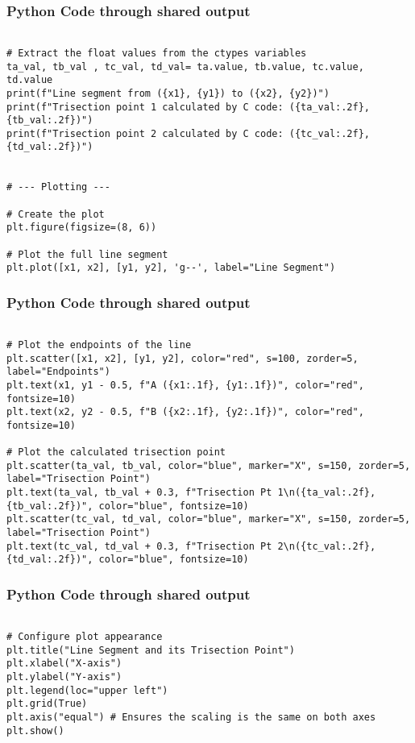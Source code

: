 \documentclass{beamer}
\begin{document}
\begin{frame}[fragile]
\frametitle{Python Code through shared output}
\begin{lstlisting}

# Extract the float values from the ctypes variables
ta_val, tb_val , tc_val, td_val= ta.value, tb.value, tc.value, td.value
print(f"Line segment from ({x1}, {y1}) to ({x2}, {y2})")
print(f"Trisection point 1 calculated by C code: ({ta_val:.2f}, {tb_val:.2f})")
print(f"Trisection point 2 calculated by C code: ({tc_val:.2f}, {td_val:.2f})")


# --- Plotting ---

# Create the plot
plt.figure(figsize=(8, 6))

# Plot the full line segment
plt.plot([x1, x2], [y1, y2], 'g--', label="Line Segment")

\end{lstlisting} 
\end{frame}
\begin{frame}[fragile]
\frametitle{Python Code through shared output}
\begin{lstlisting}

# Plot the endpoints of the line
plt.scatter([x1, x2], [y1, y2], color="red", s=100, zorder=5, label="Endpoints")
plt.text(x1, y1 - 0.5, f"A ({x1:.1f}, {y1:.1f})", color="red", fontsize=10)
plt.text(x2, y2 - 0.5, f"B ({x2:.1f}, {y2:.1f})", color="red", fontsize=10)

# Plot the calculated trisection point
plt.scatter(ta_val, tb_val, color="blue", marker="X", s=150, zorder=5, label="Trisection Point")
plt.text(ta_val, tb_val + 0.3, f"Trisection Pt 1\n({ta_val:.2f}, {tb_val:.2f})", color="blue", fontsize=10)
plt.scatter(tc_val, td_val, color="blue", marker="X", s=150, zorder=5, label="Trisection Point")
plt.text(tc_val, td_val + 0.3, f"Trisection Pt 2\n({tc_val:.2f}, {td_val:.2f})", color="blue", fontsize=10)

\end{lstlisting} 
\end{frame}
\begin{frame}[fragile]
\frametitle{Python Code through shared output}
\begin{lstlisting}

# Configure plot appearance
plt.title("Line Segment and its Trisection Point")
plt.xlabel("X-axis")
plt.ylabel("Y-axis")
plt.legend(loc="upper left")
plt.grid(True)
plt.axis("equal") # Ensures the scaling is the same on both axes
plt.show()


\end{lstlisting}
    
\end{frame}
\end{document}
